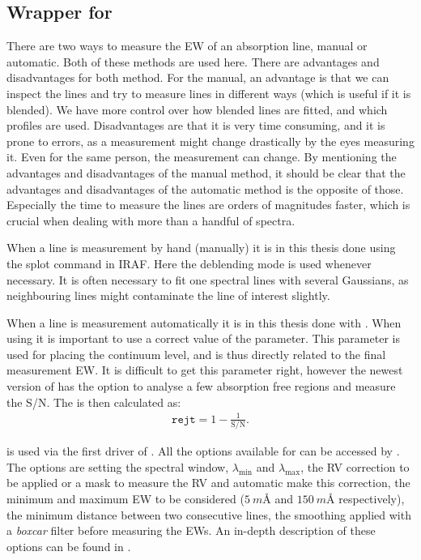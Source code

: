 \subsection{Wrapper for \ARES}
\label{sec:measureEW}

There are two ways to measure the EW of an absorption line, manual or automatic.
Both of these methods are used here. There are advantages and disadvantages for
both method. For the manual, an advantage is that we can inspect the lines and
try to measure lines in different ways (which is useful if it is blended). We
have more control over how blended lines are fitted, and which profiles are
used. Disadvantages are that it is very time consuming, and it is prone to
errors, as a measurement might change drastically by the eyes measuring it. Even
for the same person, the measurement can change. By mentioning the advantages
and disadvantages of the manual method, it should be clear that the advantages
and disadvantages of the automatic method is the opposite of those. Especially
the time to measure the lines are orders of magnitudes faster, which is crucial
when dealing with more than a handful of spectra.

When a line is measurement by hand (manually) it is in this thesis done using
the splot command in IRAF. Here the deblending mode is used whenever necessary.
It is often necessary to fit one spectral lines with several Gaussians, as
neighbouring lines might contaminate the line of interest slightly.

When a line is measurement automatically it is in this thesis done with \ARES
\citep{Sousa2007,Sousa2015a}. When using \ARES it is important to use a correct
value of the  parameter. This parameter is used for placing the
continuum level, and is thus directly related to the final measurement EW. It is
difficult to get this parameter right, however the newest version of \ARES has
the option to analyse a few absorption free regions and measure the S/N. The
 is then calculated as:
\begin{align*}
  \mathtt{rejt} = 1 - \frac{1}{\mathrm{S/N}}.
\end{align*}

\ARES is used via the first driver of \FASMA. All the options available for
\ARES can be accessed by \FASMA. The options are setting the spectral window,
$\lambda_\mathrm{min}$ and $\lambda_\mathrm{max}$, the RV correction to be
applied or a mask to measure the RV and automatic make this correction, the
minimum and maximum EW to be considered ($\SI{5}{m}$\AA{} and $\SI{150}{m}$\AA{}
respectively), the minimum distance between two consecutive lines, the smoothing
applied with a \emph{boxcar} filter before measuring the EWs. An in-depth
description of these options can be found in \citet{Sousa2007,Sousa2015a}.

